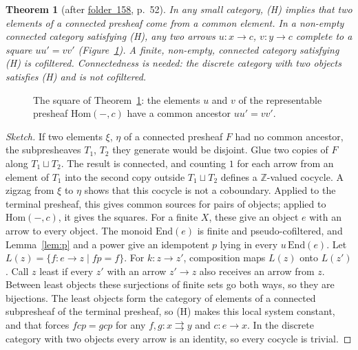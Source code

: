 \documentclass[11pt,a4paper]{amsart}
\newtheorem{theorem}{Theorem}[section]
\theoremstyle{definition}
\theoremstyle{remark}
\newcommand{\Z}{\mathbb Z}
\newcommand{\fac}[1]{\href{https://grothendieck.umontpellier.fr/#1.pdf}{folder~#1}}
\begin{document}
\begin{theorem}[after \fac{158}, p.~52]\label{thm:cof}
In any small category, (H) implies that two elements of a connected presheaf come from a common element. In a non-empty connected category satisfying (H), any two arrows $u\colon x \to c$, $v\colon y \to c$ complete to a square $uu' = vv'$ (Figure~\ref{fig:square}). A finite, non-empty, connected category satisfying (H) is cofiltered. Connectedness is needed: the discrete category with two objects satisfies (H) and is not cofiltered.
\end{theorem}

\begin{figure}[ht]
\centering
{}
\caption{The square of Theorem~\ref{thm:cof}: the elements $u$ and $v$ of the representable presheaf $\mathrm{Hom}(-, c)$ have a common ancestor $uu' = vv'$.}\label{fig:square}
\end{figure}

\begin{proof}[Sketch]
If two elements $\xi$, $\eta$ of a connected presheaf $F$ had no common ancestor, the subpresheaves $T_1$, $T_2$ they generate would be disjoint. Glue two copies of $F$ along $T_1 \sqcup T_2$. The result is connected, and counting $1$ for each arrow from an element of $T_1$ into the second copy outside $T_1 \sqcup T_2$ defines a $\Z$-valued cocycle. A zigzag from $\xi$ to $\eta$ shows that this cocycle is not a coboundary. Applied to the terminal presheaf, this gives common sources for pairs of objects; applied to $\mathrm{Hom}(-, c)$, it gives the squares. For a finite $X$, these give an object $e$ with an arrow to every object. The monoid $\mathrm{End}(e)$ is finite and pseudo-cofiltered, and Lemma~\ref{lem:p} and a power give an idempotent $p$ lying in every $u\,\mathrm{End}(e)$. Let $L(z) = \{f\colon e \to z \mid fp = f\}$. For $k\colon z \to z'$, composition maps $L(z)$ onto $L(z')$. Call $z$ least if every $z'$ with an arrow $z' \to z$ also receives an arrow from $z$. Between least objects these surjections of finite sets go both ways, so they are bijections. The least objects form the category of elements of a connected subpresheaf of the terminal presheaf, so (H) makes this local system constant, and that forces $fcp = gcp$ for any $f, g\colon x \rightrightarrows y$ and $c\colon e \to x$. In the discrete category with two objects every arrow is an identity, so every cocycle is trivial.
\end{proof}
\end{document}
